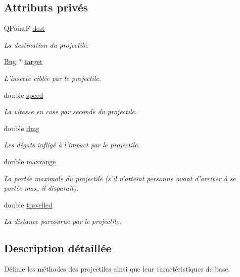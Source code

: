 \subsection*{Attributs privés}
\begin{DoxyCompactItemize}
\item 
QPointF \hyperlink{classProjectile_a15091a3a02fbfac2dd4fb44ac9cbceab}{dest}
\begin{DoxyCompactList}\small\item\em La destination du projectile. \end{DoxyCompactList}\item 
\hyperlink{classBug}{Bug} $\ast$ \hyperlink{classProjectile_ae5273bd2c6550b94f38310b69859b093}{target}
\begin{DoxyCompactList}\small\item\em L'insecte ciblée par le projectile. \end{DoxyCompactList}\item 
double \hyperlink{classProjectile_aae1f5d683c71d152b6a12d922ec4714f}{speed}
\begin{DoxyCompactList}\small\item\em La vitesse en case par seconde du projectile. \end{DoxyCompactList}\item 
double \hyperlink{classProjectile_ac94938ed5b3d3e01217bf72f80ad2e3d}{dmg}
\begin{DoxyCompactList}\small\item\em Les dégats infligé à l'impact par le projectile. \end{DoxyCompactList}\item 
double \hyperlink{classProjectile_a019db4c89ccf3eb291b06ba7b55f0754}{maxrange}
\begin{DoxyCompactList}\small\item\em La portée maximale du projectile (s'il n'atteint personne avant d'arriver à se portée max, il disparait). \end{DoxyCompactList}\item 
double \hyperlink{classProjectile_a0fc0c0258f36a9347f45d1edb8b767e5}{travelled}
\begin{DoxyCompactList}\small\item\em La distance parcourue par le projectile. \end{DoxyCompactList}\end{DoxyCompactItemize}


\subsection{Description détaillée}
Définie les méthodes des projectiles ainsi que leur caractéristiques de base. 

